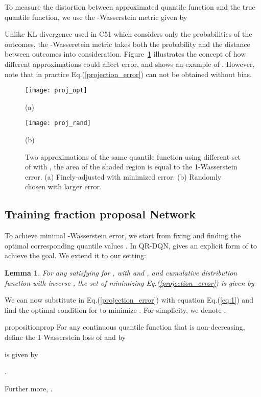 \documentclass{article}
\newtheorem{lemma}{Lemma}
\begin{document}
To measure the distortion between approximated quantile function and the true quantile function, we use the -Wasserstein metric given by

Unlike KL divergence used in C51 which considers only the probabilities of the outcomes, the -Wasseretein metric takes both the probability and the distance between outcomes into consideration. Figure~\ref{fig:proj} illustrates the concept of how different approximations could affect  error, and shows an example of . However, note that in practice Eq.(\ref{projection_error}) can not be obtained without bias.

\begin{figure}[!htb]
   \begin{minipage}{0.48\textwidth}
     \centering
     \texttt{[image: proj\_opt]}
     \caption*{(a)}
   \end{minipage}\hfill
   \begin{minipage}{0.48\textwidth}
     \centering
     \texttt{[image: proj\_rand]}
     \caption*{(b)}
   \end{minipage}
   \caption{Two approximations of the same quantile function using different set of  with , the area of the shaded region is equal to the 1-Wasserstein error. (a) Finely-adjusted  with minimized  error. (b) Randomly chosen  with larger  error.}
   \label{fig:proj}
\end{figure}

\subsection{Training fraction proposal Network}
To achieve minimal -Wasserstein error, we start from fixing  and finding the optimal corresponding quantile values . In QR-DQN, \cite{dabney2018implicit} gives an explicit form of  to achieve the goal. We extend it to our setting:

\begin{lemma}
\label{lemma:1}
\citep{dabney2018implicit} For any  satisfying  for , with  and , and cumulative distribution function  with inverse , the set of  minimizing Eq.(\ref{projection_error})
is given by 

\end{lemma}

We can now substitute  in Eq.(\ref{projection_error}) with equation Eq.(\ref{eq:1}) and find the optimal condition for  to minimize . For simplicity, we denote .

\begin{restatable}{proposition}{prop}
\label{proposition:1}
For any continuous quantile function  that is non-decreasing, define the 1-Wasserstein loss of  and  by

 is given by 

. 

Further more, .
\end{restatable}
\end{document}
